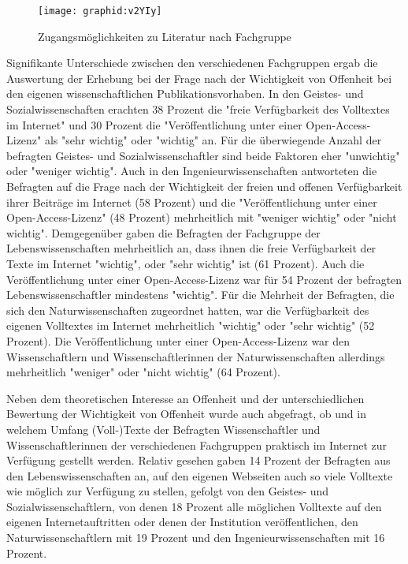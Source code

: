 \begin{figure}[h!]
\texttt{[image: graphid:v2YIy]}
\caption{Zugangsmöglichkeiten zu Literatur nach Fachgruppe}
\end{figure}

Signifikante Unterschiede zwischen den verschiedenen Fachgruppen ergab die Auswertung der Erhebung bei der Frage nach der Wichtigkeit von Offenheit bei den eigenen wissenschaftlichen Publikationsvorhaben. In den Geistes- und Sozialwissenschaften erachten 38 Prozent die "freie Verfügbarkeit des Volltextes im Internet" und 30 Prozent die "Veröffentlichung unter einer Open-Access-Lizenz" als "sehr wichtig" oder "wichtig" an. Für die überwiegende Anzahl der befragten Geistes- und Sozialwissenschaftler sind beide Faktoren eher "unwichtig" oder "weniger wichtig". Auch in den Ingenieurwissenschaften antworteten die Befragten auf die Frage nach der Wichtigkeit der freien und offenen Verfügbarkeit ihrer Beiträge im Internet (58 Prozent) und die "Veröffentlichung unter einer Open-Access-Lizenz" (48 Prozent) mehrheitlich mit "weniger wichtig" oder "nicht wichtig". Demgegenüber gaben die Befragten der Fachgruppe der Lebenswissenschaften mehrheitlich an, dass ihnen die freie Verfügbarkeit der Texte im Internet "wichtig", oder "sehr wichtig" ist (61 Prozent). Auch die Veröffentlichung unter einer Open-Access-Lizenz war für 54 Prozent der befragten Lebenswissenschaftler mindestens "wichtig". Für die Mehrheit der Befragten, die sich den Naturwissenschaften zugeordnet hatten, war die Verfügbarkeit des eigenen Volltextes im Internet mehrheitlich "wichtig" oder "sehr wichtig" (52 Prozent). Die Veröffentlichung unter einer Open-Access-Lizenz war den Wissenschaftlern und Wissenschaftlerinnen der Naturwissenschaften allerdings mehrheitlich "weniger" oder "nicht wichtig" (64 Prozent).

Neben dem theoretischen Interesse an Offenheit und der unterschiedlichen Bewertung der Wichtigkeit von Offenheit wurde auch abgefragt, ob und in welchem Umfang (Voll-)Texte der Befragten Wissenschaftler und Wissenschaftlerinnen der verschiedenen Fachgruppen praktisch im Internet zur Verfügung gestellt werden. Relativ gesehen gaben 14 Prozent der Befragten aus den Lebenswissenschaften an, auf den eigenen Webseiten auch so viele Volltexte wie möglich zur Verfügung zu stellen, gefolgt von den Geistes- und Sozialwissenschaftlern, von denen 18 Prozent alle möglichen Volltexte auf den eigenen Internetauftritten oder denen der Institution veröffentlichen, den Naturwissenschaftlern mit 19 Prozent und den Ingenieurwissenschaften mit 16 Prozent.

